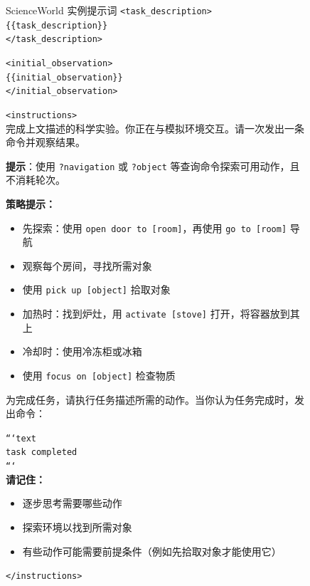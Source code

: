 \begin{figure}[!htbp]
\begin{paperbox}{ScienceWorld 实例提示词}
\texttt{<task\_description>} \\
\texttt{\{\{task\_description\}\}} \\
\texttt{</task\_description>}

\vspace{0.2cm}
\texttt{<initial\_observation>} \\
\texttt{\{\{initial\_observation\}\}} \\
\texttt{</initial\_observation>}

\vspace{0.2cm}
\texttt{<instructions>} \\
完成上文描述的科学实验。你正在与模拟环境交互。请一次发出一条命令并观察结果。

\vspace{0.2cm}
\textbf{提示}：使用 \texttt{?navigation} 或 \texttt{?object} 等查询命令探索可用动作，且不消耗轮次。

\vspace{0.2cm}
\textbf{策略提示：}
\begin{itemize}
\item 先探索：使用 \texttt{open door to [room]}，再使用 \texttt{go to [room]} 导航
\item 观察每个房间，寻找所需对象
\item 使用 \texttt{pick up [object]} 拾取对象
\item 加热时：找到炉灶，用 \texttt{activate [stove]} 打开，将容器放到其上
\item 冷却时：使用冷冻柜或冰箱
\item 使用 \texttt{focus on [object]} 检查物质
\end{itemize}

\vspace{0.2cm}
为完成任务，请执行任务描述所需的动作。当你认为任务完成时，发出命令：

\vspace{0.2cm}
\texttt{```text} \\
\texttt{task completed} \\
\texttt{```} \\

\vspace{0.2cm}
\textbf{请记住：}
\begin{itemize}
\item 逐步思考需要哪些动作
\item 探索环境以找到所需对象
\item 有些动作可能需要前提条件（例如先拾取对象才能使用它）
\end{itemize}
\texttt{</instructions>}
\end{paperbox}
\end{figure}
